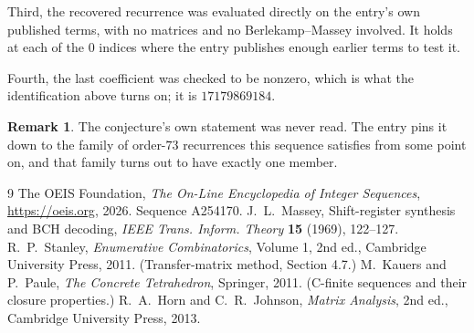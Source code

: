 \documentclass[11pt,a4paper]{article}
\theoremstyle{plain}
\theoremstyle{definition}
\newtheorem{remark}[theorem]{Remark}
\begin{document}
Third, the recovered recurrence was evaluated directly on the entry's own published terms, with
no matrices and no Berlekamp--Massey involved. It holds at each of the $0$ indices where
the entry publishes enough earlier terms to test it.

Fourth, the last coefficient was checked to be nonzero, which is what the identification above
turns on; it is $17179869184$.

\begin{remark}
The conjecture's own statement was never read. The entry pins it down to the family of
order-$73$ recurrences this sequence satisfies from some point on, and that family turns
out to have exactly one member.
\end{remark}

\begin{thebibliography}{9}
 The OEIS Foundation, \emph{The On-Line Encyclopedia of Integer
Sequences}, \url{https://oeis.org}, 2026. Sequence A254170.
 J.~L.~Massey, Shift-register synthesis and BCH decoding, \emph{IEEE
Trans. Inform. Theory} \textbf{15} (1969), 122--127.
 R.~P.~Stanley, \emph{Enumerative Combinatorics}, Volume 1, 2nd ed.,
Cambridge University Press, 2011. (Transfer-matrix method, Section 4.7.)
 M.~Kauers and P.~Paule, \emph{The Concrete Tetrahedron}, Springer, 2011.
(C-finite sequences and their closure properties.)
 R.~A.~Horn and C.~R.~Johnson, \emph{Matrix Analysis}, 2nd ed., Cambridge
University Press, 2013.
\end{thebibliography}
\end{document}
